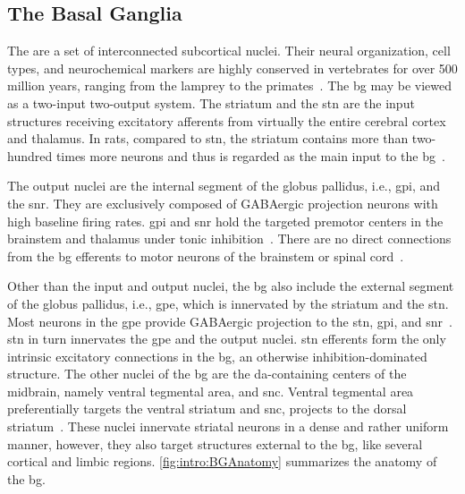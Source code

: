 \subsection{The Basal Ganglia}
\label{intro:BGAnatomy}
The  are a set of interconnected subcortical nuclei.
Their neural organization, cell types, and neurochemical markers are highly conserved in vertebrates for over 500 million years, ranging from the lamprey to the primates~\cite{Grillner2016BG}.
The \gls{bg} may be viewed as a two-input two-output system.
The striatum and the \gls{stn} are the input structures receiving excitatory afferents from virtually the entire cerebral cortex and thalamus.
In rats, compared to \gls{stn}, the striatum contains more than two-hundred times more neurons and thus is regarded as the main input to the \gls{bg}~\cite{Oorschot1996}.
\par
The output nuclei are the internal segment of the globus pallidus, i.e., \gls{gpi}, and the \gls{snr}.
They are exclusively composed of GABAergic projection neurons with high baseline firing rates.
\Gls{gpi} and \gls{snr} hold the targeted premotor centers in the brainstem and thalamus under tonic inhibition~\cite{Redgrave2010}.
There are no direct connections from the \gls{bg} efferents to motor neurons of the brainstem or spinal cord~\cite{Mink1996}.
\par
Other than the input and output nuclei, the \gls{bg} also include the external segment of the globus pallidus, i.e., \gls{gpe}, which is innervated by the striatum and the \gls{stn}.
Most neurons in the \gls{gpe} provide GABAergic projection to the \gls{stn}, \gls{gpi}, and \gls{snr}~\cite{Dudman2015Book}.
\Gls{stn} in turn innervates the \gls{gpe} and the output nuclei.
\Gls{stn} efferents form the only intrinsic excitatory connections in the \gls{bg}, an otherwise inhibition-dominated structure.
The other nuclei of the \gls{bg} are the \gls{da}-containing centers of the midbrain, namely ventral tegmental area, and \gls{snc}.
Ventral tegmental area preferentially targets the ventral striatum and \gls{snc}, projects to the dorsal striatum~\cite{Cox2019NatRevNeurosci}.
These nuclei innervate striatal neurons in a dense and rather uniform manner, however, they also target structures external to the \gls{bg}, like several cortical and limbic regions.
\autoref{fig:intro:BGAnatomy} summarizes the anatomy of the \gls{bg}.


